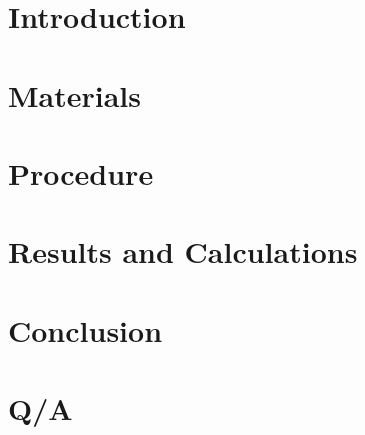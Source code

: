 \documentclass[12pt]{article}
\begin{document}
 

\ReportPages
\LabHeader
\TemplateReminder

\section*{Introduction}
\lipsum[1]
\section*{Materials}
\lipsum[2]
\section*{Procedure}
\lipsum[3]
\section*{Results and Calculations}
\lipsum[4-6]
\section*{Conclusion}
\lipsum[7]

\pagebreak
\section*{Q/A}


\pagebreak
	
\end{document}
